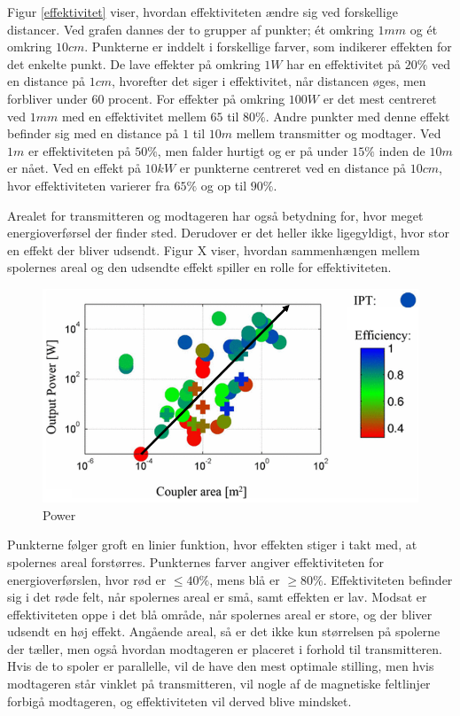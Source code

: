 Figur \ref{effektivitet} viser, hvordan effektiviteten ændre sig ved forskellige distancer. Ved grafen dannes der to grupper af punkter; ét omkring $1mm$ og ét omkring $10cm$. Punkterne er inddelt i forskellige farver, som indikerer effekten for det enkelte punkt. De lave effekter på omkring $1W$ har en effektivitet på $20\%$ ved en distance på $1cm$, hvorefter det siger i effektivitet, når distancen øges, men forbliver under 60 procent. For effekter på omkring $100W$ er det mest centreret ved $1mm$ med en effektivitet mellem $65$ til $80\%$. Andre punkter med denne effekt befinder sig med en distance på $1$ til $10m$ mellem transmitter og modtager. Ved $1m$ er effektiviteten på $50\%$, men falder hurtigt og er på under $15\%$ inden de $10m$ er nået. Ved en effekt på $10kW$ er punkterne centreret ved en distance på $10cm$, hvor effektiviteten varierer fra $65\%$ og op til $90\%$.

Arealet for transmitteren og modtageren har også betydning for, hvor meget energioverførsel der finder sted. Derudover er det heller ikke ligegyldigt, hvor stor en effekt der bliver udsendt. Figur X viser, hvordan sammenhængen mellem spolernes areal og den udsendte effekt spiller en rolle for effektiviteten.

\begin{figure}[H]
\centering
\includegraphics[scale=0.5]{Vildledning/Schematics/Power_vs_coupler-area.png}
\caption{Power \cite{limit}}
\end{figure}

Punkterne følger groft en linier funktion, hvor effekten stiger i takt med, at spolernes areal forstørres. Punkternes farver angiver effektiviteten for energioverførslen, hvor rød er $\leq 40\%$, mens blå er $\geq 80\%$. Effektiviteten befinder sig i det røde felt, når spolernes areal er små, samt effekten er lav. Modsat er effektiviteten oppe i det blå område, når spolernes areal er store, og der bliver udsendt en høj effekt. Angående areal, så er det ikke kun størrelsen på spolerne der tæller, men også hvordan modtageren er placeret i forhold til transmitteren. Hvis de to spoler er parallelle, vil de have den mest optimale stilling, men hvis modtageren står vinklet på transmitteren, vil nogle af de magnetiske feltlinjer forbigå modtageren, og effektiviteten vil derved blive mindsket.

